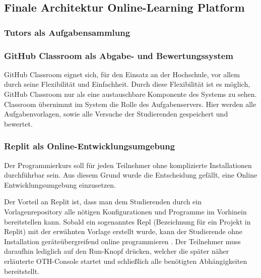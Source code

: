 \subsection{Finale Architektur Online-Learning Platform}
\subsubsection{Tutors als Aufgabensammlung}
\subsubsection{GitHub Classroom als Abgabe- und Bewertungssystem}
GitHub Classroom eignet sich, für den Einsatz an der Hochschule, vor allem durch
seine Flexibilität und Einfachheit. Durch diese Flexibilität ist es möglich,
GitHub Classroom nur als eine austauschbare Komponente des Systems zu sehen.
Classroom übernimmt im System die Rolle des Aufgabenservers. Hier werden alle
Aufgabenvorlagen, sowie alle Versuche der Studierenden gespeichert und bewertet.

\subsubsection{Replit als Online-Entwicklungsumgebung}
Der Programmierkurs soll für jeden Teilnehmer ohne komplizierte Installationen
durchführbar sein. Aus diesem Grund wurde die Entscheidung gefällt, eine
Online Entwicklungsumgebung einzusetzen.

Der Vorteil an Replit ist, dass man dem Studierenden durch ein
Vorlagenrepository alle nötigen Konfigurationen und Programme im Vorhinein
bereitstellen kann. Sobald ein sogenanntes \glqq Repl\grqq{} (Bezeichnung für
ein Projekt in Replit) mit der erwähnten Vorlage erstellt wurde, kann der
Studierende ohne Installation geräteübergreifend online programmieren
\cite{replit-import-from-github}. Der Teilnehmer muss daraufhin lediglich auf
den \glqq Run\grqq{}-Knopf drücken, welcher die später näher erläuterte
\glqq OTH-Console\grqq{} startet und schließlich alle benötigten Abhängigkeiten bereitstellt.